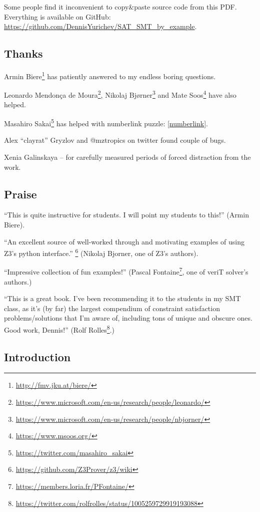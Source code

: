 Some people find it inconvenient to copy\&paste source code from this PDF.
Everything is available on GitHub: \url{https://github.com/DennisYurichev/SAT_SMT_by_example}.

\subsection{Thanks}

Armin Biere\footnote{\url{http://fmv.jku.at/biere/}} has patiently answered to my endless boring questions.

Leonardo Mendonça de Moura\footnote{\url{https://www.microsoft.com/en-us/research/people/leonardo/}},
Nikolaj Bjørner\footnote{\url{https://www.microsoft.com/en-us/research/people/nbjorner/}}
and Mate Soos\footnote{\url{https://www.msoos.org/}} have also helped.

Masahiro Sakai\footnote{\url{https://twitter.com/masahiro_sakai}} has helped with numberlink puzzle: \ref{numberlink}.

Alex ``clayrat'' Gryzlov and @mztropics on twitter found couple of bugs.

Xenia Galinskaya -- for carefully measured periods of forced distraction from the work.

\subsection{Praise}

``This is quite instructive for students. I will point my students to this!'' (Armin Biere).

``An excellent source of well-worked through and motivating examples of using Z3's python interface.''
\footnote{\url{https://github.com/Z3Prover/z3/wiki}}
(Nikolaj Bjorner, one of Z3's authors).

``Impressive collection of fun examples!''
(Pascal Fontaine\footnote{\url{https://members.loria.fr/PFontaine/}}, one of veriT solver's authors.)

``This is a great book. I've been recommending it to the students in my SMT class, as it's (by far) the largest compendium of constraint satisfaction problems/solutions that I'm aware of, including tons of unique and obscure ones. Good work, Dennis!''
(Rolf Rolles\footnote{\url{https://twitter.com/rolfrolles/status/1005259729919193088}}.)

\subsection{Introduction}

